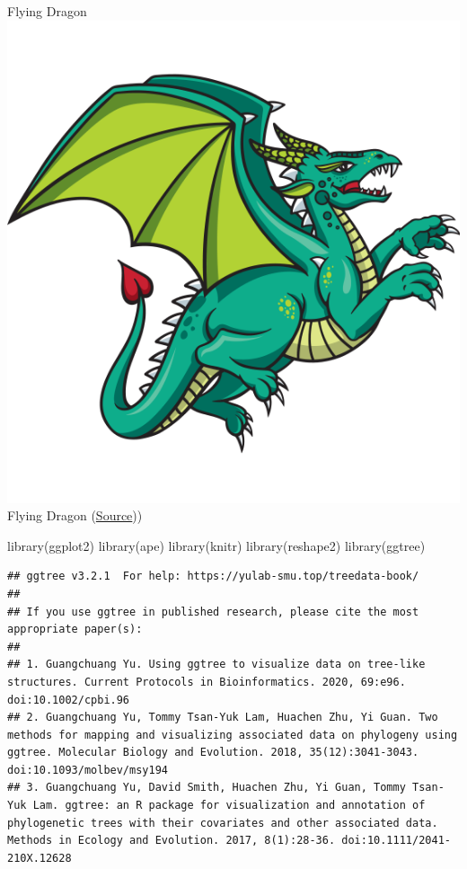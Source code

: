 \documentclass[
]{article}
\newenvironment{Shaded}{\begin{snugshade}}{\end{snugshade}}
\newcommand{\FunctionTok}[1]{\textcolor[rgb]{0.00,0.00,0.00}{#1}}
\newcommand{\NormalTok}[1]{#1}
\begin{document}
Flying Dragon \includegraphics{images/Dragon3.png} Flying Dragon
(\href{https://www.feedyourdragon.com/about.html}{Source}))

\begin{Shaded}
\begin{Highlighting}[]
\FunctionTok{library}\NormalTok{(ggplot2)}
\FunctionTok{library}\NormalTok{(ape)}
\FunctionTok{library}\NormalTok{(knitr)}
\FunctionTok{library}\NormalTok{(reshape2)}
\FunctionTok{library}\NormalTok{(ggtree)}
\end{Highlighting}
\end{Shaded}

\begin{verbatim}
## ggtree v3.2.1  For help: https://yulab-smu.top/treedata-book/
## 
## If you use ggtree in published research, please cite the most appropriate paper(s):
## 
## 1. Guangchuang Yu. Using ggtree to visualize data on tree-like structures. Current Protocols in Bioinformatics. 2020, 69:e96. doi:10.1002/cpbi.96
## 2. Guangchuang Yu, Tommy Tsan-Yuk Lam, Huachen Zhu, Yi Guan. Two methods for mapping and visualizing associated data on phylogeny using ggtree. Molecular Biology and Evolution. 2018, 35(12):3041-3043. doi:10.1093/molbev/msy194
## 3. Guangchuang Yu, David Smith, Huachen Zhu, Yi Guan, Tommy Tsan-Yuk Lam. ggtree: an R package for visualization and annotation of phylogenetic trees with their covariates and other associated data. Methods in Ecology and Evolution. 2017, 8(1):28-36. doi:10.1111/2041-210X.12628
\end{verbatim}
\end{document}
